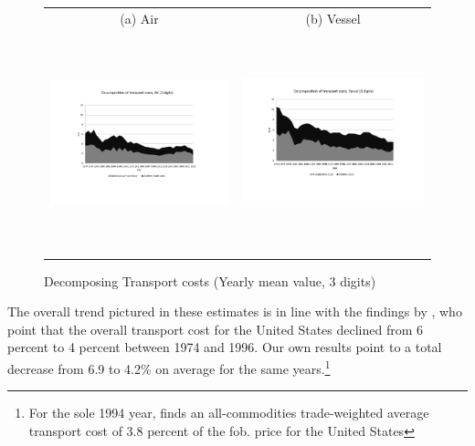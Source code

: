 \documentclass[a4paper,11pt]{article}
\begin{document}
\begin{figure}[htbp]
\caption{Decomposing Transport costs (Yearly mean value, 3 digits)}
\label{fig:decomp_TC_3d}
\begin{center}
\begin{tabular}{cc}
{\small (a) Air } & {\small (b) Vessel}\\
\includegraphics[width=3in, height=2.5in]{Fig2a_decompTC_air_3d.pdf}
& \includegraphics[width=3in,height=2.5in]{Fig2b_decompTC_vessel_3d.pdf} \\
\end{tabular}
\end{center}
\end{figure}


The overall trend pictured in these estimates is in line with the findings by \citet{Hummels_1999}, who point that the overall transport cost for the United States declined from 6 percent to 4 percent between 1974 and 1996. Our own results point to a total decrease from 6.9 to 4.2\% on average for the same years.\footnote{For the sole 1994 year, \citet{Hummels_2001} finds an all-commodities trade-weighted average transport cost of 3.8 percent of the fob. price for the United States }
\end{document}

